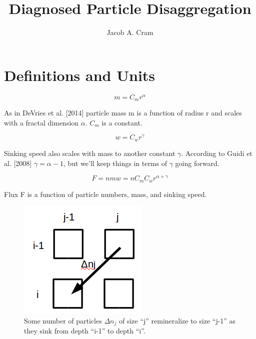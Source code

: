 \documentclass[a4paper,12pt]{article}
\newcommand\addtag{\refstepcounter{equation}\tag{\theequation}}
\begin{document}
\title{Diagnosed Particle Disaggregation}
\author{Jacob A. Cram}
\maketitle

\section{Definitions and Units}

\begin{equation}
  m = C_m r^\alpha %
  \label{eqn:m}
\end{equation}

As in DeVries et al. [2014] particle mass m is a function of radius r and scales with a fractal dimension $\alpha$. $C_m$ is a constant.

\begin{equation}
  w = C_wr^\gamma %
  \label{eqn:w}
\end{equation}

Sinking speed also scales with mass to another constant $\gamma$. 
According to Guidi et al. [2008] $\gamma = \alpha - 1$, but we'll keep things in terms of $\gamma$ going forward.

\begin{equation}
  F = nmw = n C_m C_w r^{\alpha + \gamma}
\end{equation}

Flux F is a function of particle numbers, mass, and sinking speed.



\begin{figure}[h]
  \includegraphics{ijFig2.png}
  
  \centering
  \caption{Some number of particles $\Delta n_j$ of size ``j'' remineralize to size ``j-1'' as they sink from depth ``i-1'' to depth ``i''.}
  \label{fig:boxes}
\end{figure}
\end{document}
